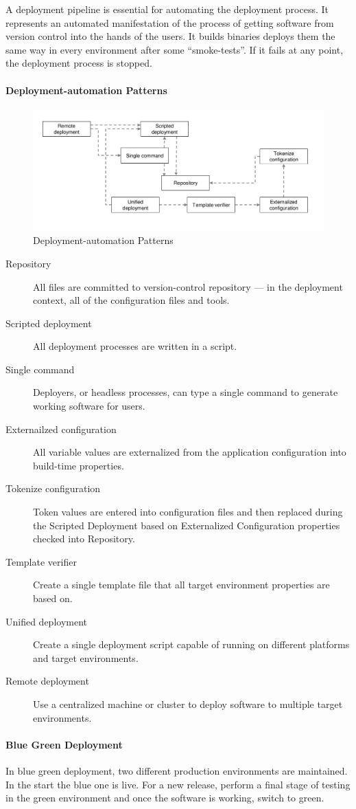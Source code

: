 A deployment pipeline is essential for automating the deployment process.
It represents an automated manifestation of the process of getting software from version control into the hands of the users.
It builds binaries deploys them the same way in every environment after some ``smoke-tests''.
If it fails at any point, the deployment process is stopped.

\paragraph{Deployment-automation Patterns}
\begin{figure}[H]
  \centering
  \includegraphics[width=.8\textwidth]{images/deployment_automation_patterns.png}
  \caption{Deployment-automation Patterns}
\end{figure}
\begin{description}
  \item[Repository] All files are committed to version-control repository — in the deployment context, all of the configuration files and tools.
  \item[Scripted deployment] All deployment processes are written in a script.
  \item[Single command] Deployers, or headless processes, can type a single command to generate working software for users.
  \item[Externailzed configuration] All variable values are externalized from the application configuration into build-time properties.
  \item[Tokenize configuration] Token values are entered into configuration files and then replaced during the Scripted Deployment based on Externalized Configuration properties checked into Repository.
  \item[Template verifier] Create a single template file that all target environment properties are based on.
  \item[Unified deployment] Create a single deployment script capable of running on different platforms and target environments.
  \item[Remote deployment] Use a centralized machine or cluster to deploy software to multiple target environments.
\end{description}

\paragraph{Blue Green Deployment}
In blue green deployment, two different production environments are maintained.
In the start the blue one is live.
For a new release, perform a final stage of testing in the green environment and once the software is working, switch to green.
